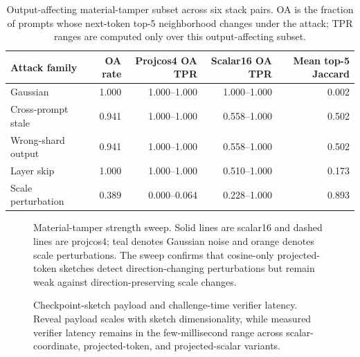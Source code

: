 \documentclass[sigplan,screen,review,anonymous]{acmart}
\newcommand{\suppStrengthSweepWidth}{1\linewidth}
\newcommand{\suppPayloadLatencyWidth}{1\linewidth}
\begin{document}
\begin{table}[t]
\centering
\scriptsize
\setlength{\tabcolsep}{3.8pt}
\caption{Output-affecting material-tamper subset across six stack pairs. OA is
the fraction of prompts whose next-token top-5 neighborhood changes under the
attack; TPR ranges are computed only over this output-affecting subset.}
\label{tab:app-output-affecting}
\begin{tabular}{lrrrr}
\toprule
Attack family & OA rate & Projcos4 OA TPR & Scalar16 OA TPR & Mean top-5 Jaccard \\
\midrule
Gaussian & 1.000 & 1.000--1.000 & 1.000--1.000 & 0.002 \\
Cross-prompt stale & 0.941 & 1.000--1.000 & 0.558--1.000 & 0.502 \\
Wrong-shard output & 0.941 & 1.000--1.000 & 0.558--1.000 & 0.502 \\
Layer skip & 1.000 & 1.000--1.000 & 0.510--1.000 & 0.173 \\
Scale perturbation & 0.389 & 0.000--0.064 & 0.228--1.000 & 0.893 \\
\bottomrule
\end{tabular}
\end{table}

\begin{figure}[t]
\centering
\resizebox{\suppStrengthSweepWidth}{!}{}
\caption{Material-tamper strength sweep. Solid lines are scalar16 and dashed
lines are projcos4; teal denotes Gaussian noise and orange denotes scale
perturbations. The sweep confirms that cosine-only projected-token sketches
detect direction-changing perturbations but remain weak against
direction-preserving scale changes.}
\label{fig:app-strength-sweep}
\end{figure}

\begin{figure}[t]
\centering
\resizebox{\suppPayloadLatencyWidth}{!}{}
\caption{Checkpoint-sketch payload and challenge-time verifier latency. Reveal
payload scales with sketch dimensionality, while measured verifier latency
remains in the few-millisecond range across scalar-coordinate, projected-token,
and projected-scalar variants.}
\label{fig:app-payload-latency}
\end{figure}
\end{document}
